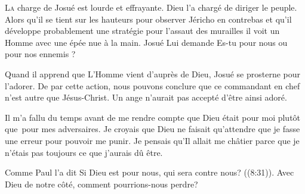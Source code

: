 



\lettrine{L}{a} charge de Josué est lourde et effrayante.
 Dieu l'a chargé de diriger le peuple.
 Alors qu'il se tient sur les hauteurs pour observer Jéricho en contrebas
 \ocadr et qu'il développe probablement une stratégie
 pour l'assaut des murailles \fcadr{}
 il voit un Homme avec une épée nue à la main.
 Josué Lui demande\frcolon{} \Og Es-tu pour nous ou pour nos ennemis ? \Fg{}

Quand il apprend que L'Homme vient d'auprès de Dieu,
 Josué se prosterne pour l'adorer.
 De par cette action, nous pouvons conclure que ce commandant en chef
 n'est autre que Jésus-Christ. Un ange n'aurait pas accepté d'être ainsi adoré.

Il m'a fallu du temps avant de me rendre compte que Dieu
 était pour moi plutôt que~pour mes adversaires.
 Je croyais que Dieu ne faisait qu'attendre
 que je fasse une erreur pour pouvoir me punir.
 Je pensais qu'Il allait me châtier
 parce que je n'étais pas toujours ce que j'aurais dû être.


Comme Paul l'a dit\frcolon{}
 \Og Si Dieu est pour nous, qui sera contre nous? \Fg{} ((8:31)).
 Avec Dieu de notre côté, comment pourrions-nous perdre? 

\dvrule



